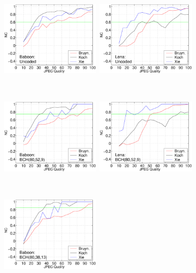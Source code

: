 \documentclass[12pt]{report}
\begin{document}
\begin{figure}[p]
\setlength{\abovecaptionskip}{-0.25cm}
\centerline{ \hbox{
        \includegraphics[height=4.6cm,width=4.8cm]{BKX_EPS_formattedBetter/Baboon80_80_1.eps}
        \includegraphics[height=4.6cm,width=4.8cm]{BKX_EPS_formattedBetter/Lena80_80_1.eps} \\
}} 
\centerline{ \hbox{
        \includegraphics[height=4.6cm,width=4.8cm]{BKX_EPS_formattedBetter/Baboon80_52_9.eps}
        \includegraphics[height=4.6cm,width=4.8cm]{BKX_EPS_formattedBetter/Lena80_52_9.eps} \\
}} 
\centerline{ \hbox{
        \includegraphics[height=4.6cm,width=4.8cm]{BKX_EPS_formattedBetter/Baboon80_38_13.eps}
}}
\end{figure}
\end{document}
